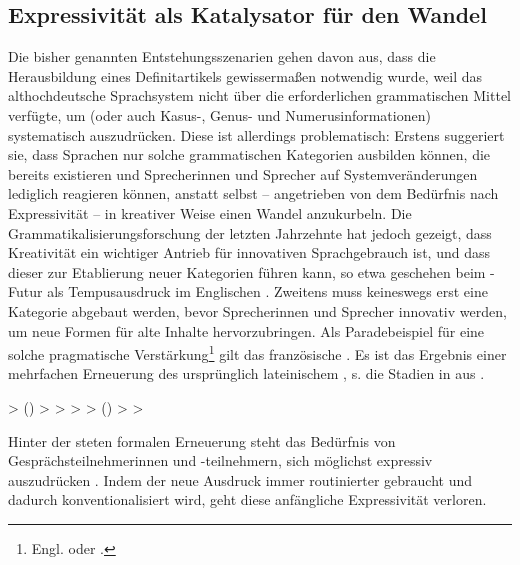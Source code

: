 \subsection{Expressivität als Katalysator für den Wandel} \label{sec:kata}

Die bisher genannten Entstehungsszenarien gehen davon aus, dass die Herausbildung eines Definitartikels  gewissermaßen notwendig wurde, weil das althochdeutsche Sprachsystem nicht über die erforderlichen grammatischen Mittel verfügte, um  (oder auch Kasus-, Genus- und Numerusinformationen) systematisch auszudrücken. Diese  ist allerdings problematisch: Erstens suggeriert sie, dass Sprachen nur solche grammatischen Kategorien ausbilden können, die bereits existieren und Sprecherinnen und Sprecher auf Systemveränderungen lediglich reagieren können, anstatt selbst -- angetrieben von dem Bedürfnis nach Expressivität -- in kreativer Weise einen Wandel anzukurbeln. Die Grammatikalisierungsforschung  der letzten Jahrzehnte hat jedoch gezeigt, dass Kreativität ein wichtiger Antrieb für innovativen Sprachgebrauch ist, und dass dieser zur Etablierung neuer Kategorien führen kann, so etwa geschehen beim -Futur als Tempusausdruck im Englischen \parencite[s. z.B.][30]{Heine1991}. Zweitens muss keineswegs erst eine Kategorie abgebaut werden, bevor Sprecherinnen und Sprecher innovativ werden, um neue Formen für alte Inhalte hervorzubringen. Als Paradebeispiel für eine solche pragmatische Verstärkung\footnote{Engl.  oder  \parencite[s.][94]{Hopper2006}.} gilt das französische  . Es ist das Ergebnis einer mehrfachen Erneuerung des ursprünglich lateinischem , s. die Stadien in  aus \textcite[94]{Hopper2006}. 

\begin{exe}
	\ex \label{ex:ca}   > ()    >  >  >  > ()  >  > 
\end{exe}

Hinter der steten formalen Erneuerung steht das Bedürfnis von Gesprächsteilnehmerinnen und -teilnehmern, sich möglichst expressiv auszudrücken \parencites[179]{Detges2002}[73]{Hopper2006}[176]{Lehmann2015}. Indem der neue Ausdruck immer routinierter gebraucht und dadurch konventionalisiert wird, geht diese anfängliche Expressivität verloren. 

